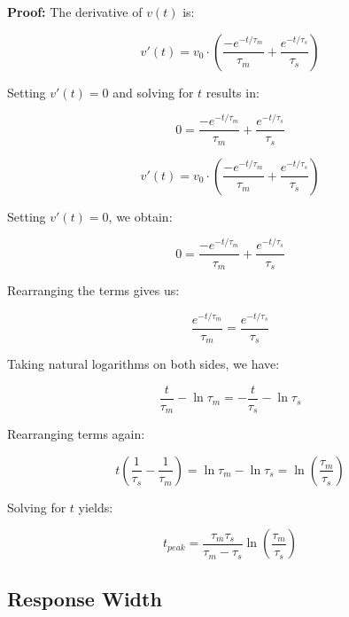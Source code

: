 \textbf{Proof:}
The derivative of $v(t)$ is:

\begin{equation}
v'(t) = v_0 \cdot \left(\frac{-e^{-t/\tau_m}}{\tau_m} + \frac{e^{-t/\tau_s}}{\tau_s}\right)
\end{equation}

Setting $v'(t) = 0$ and solving for $t$ results in:

\begin{equation}
0 = \frac{-e^{-t/\tau_m}}{\tau_m} + \frac{e^{-t/\tau_s}}{\tau_s}
\end{equation}

\begin{equation}
v'(t) = v_0 \cdot \left(\frac{-e^{-t/\tau_m}}{\tau_m} + \frac{e^{-t/\tau_s}}{\tau_s}\right)
\end{equation}

Setting $v'(t) = 0$, we obtain:

\begin{equation}
0 = \frac{-e^{-t/\tau_m}}{\tau_m} + \frac{e^{-t/\tau_s}}{\tau_s}
\end{equation}

Rearranging the terms gives us:

\begin{equation}
\frac{e^{-t/\tau_m}}{\tau_m} = \frac{e^{-t/\tau_s}}{\tau_s}
\end{equation}

Taking natural logarithms on both sides, we have:

\begin{equation}
\frac{t}{\tau_m} - \ln \tau_m = - \frac{t}{\tau_s} - \ln \tau_s
\end{equation}

Rearranging terms again:

\begin{equation}
t \left( \frac{1}{\tau_s} - \frac{1}{\tau_m} \right) = \ln \tau_m - \ln \tau_s = \ln\left(\frac{\tau_m}{\tau_s}\right)
\end{equation}

Solving for $t$ yields:

\begin{equation}
t_{peak} = \frac{\tau_m \tau_s}{\tau_m - \tau_s} \ln\left(\frac{\tau_m}{\tau_s}\right)
\end{equation}


\subsection{Response Width}

